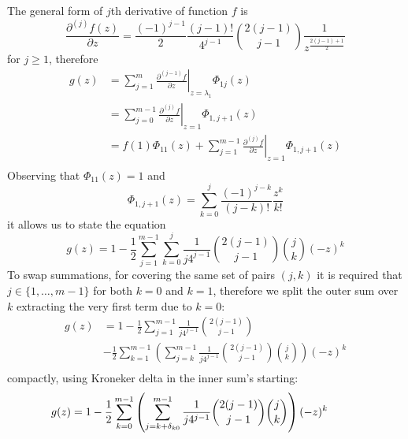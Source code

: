 The general form of $j$th derivative of function $f$ is 
$$\frac{\partial^{(j)}{f}(z)}{\partial{z}} =\frac{(-1)^{j-1}}{2}\frac{(j-1)!}{4^{j-1}}{{2(j-1)}\choose{j-1}}\frac{1}{z^{\frac{2(j-1)+1}{2}}} $$ 
for $j \geq 1$, therefore
\begin{displaymath}
\begin{split}
  g(z) &= \sum_{j=1}^{m}{ \left. \frac{\partial^{(j-1)}{f}}{\partial{z}} \right|_{z=\lambda_{1}}\Phi_{1j}(z)} \\
       &= \sum_{j=0}^{m-1}{ \left. \frac{\partial^{(j)}{f}}{\partial{z}} \right|_{z=1}\Phi_{1,j+1}(z)} \\
       &= f(1)\Phi_{11}(z) + \sum_{j=1}^{m-1}{ \left. \frac{\partial^{(j)}{f}}{\partial{z}} \right|_{z=1}\Phi_{1,j+1}(z)} \\
\end{split}
\end{displaymath}
Observing that $\Phi_{11}(z)=1$ and
\begin{displaymath}
  \Phi_{1,j+1}(z) = \sum_{k=0}^{j}{\frac{(-1)^{j-k}}{(j-k)!}\frac{z^{k}}{k!}}
\end{displaymath}
it allows us to state the equation
\begin{equation}
  g(z) = 1 - \frac{1}{2} \sum_{j=1}^{m-1}{\sum_{k=0}^{j}{\frac{1}{j 4^{j-1}} {{2(j-1)}\choose{j-1}}{{j}\choose{k}} (-z)^{k}}}
\end{equation}
To swap summations, for covering the same set of pairs $(j, k)$ it is required that 
$j\in \lbrace 1, \ldots, m-1 \rbrace$ for both $k=0$ and $k=1$, therefore we split
the outer sum over $k$ extracting the very first term due to $k=0$:
\begin{equation}
\begin{split}
  g(z) &= 1 - \frac{1}{2}\sum_{j=1}^{m-1}{\frac{1}{j 4^{j-1}} {{2(j-1)}\choose{j-1}}} \\
       &- \frac{1}{2} \sum_{k=1}^{m-1}{\left(\sum_{j=k}^{m-1}{\frac{1}{j 4^{j-1}} {{2(j-1)}\choose{j-1}}{{j}\choose{k}}}\right)(-z)^{k}} \\
\end{split}
\end{equation}
compactly, using Kroneker delta in the inner sum's starting:
\begin{equation}
\hspace{-1cm}
  g(z) = 1 - \frac{1}{2} \sum_{k=0}^{m-1}{\left(\sum_{j=k+\delta_{k0}}^{m-1}{\frac{1}{j 4^{j-1}} {{2(j-1)}\choose{j-1}}{{j}\choose{k}}}\right)(-z)^{k}} \\
\end{equation}


